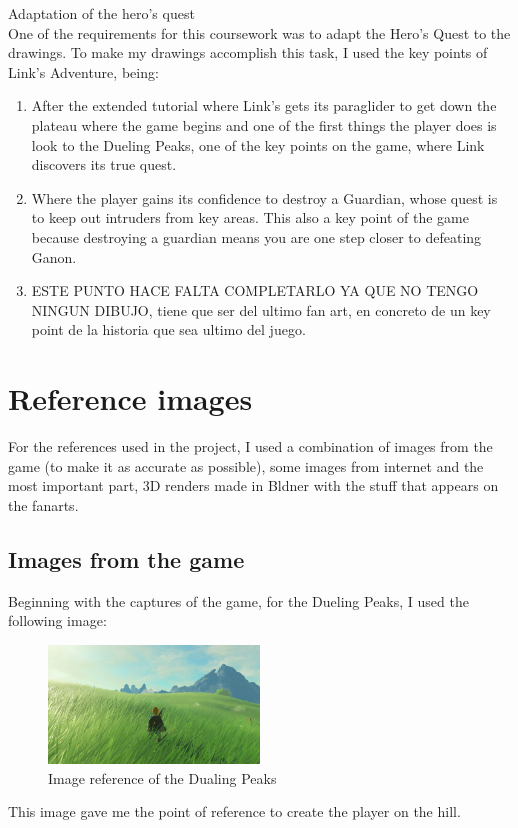 \documentclass{cup-pan}
\begin{document}
    \textcolor{PANDarkBlue}{\large Adaptation of the hero's quest}\\
    One of the requirements for this coursework was to adapt the Hero's Quest to the drawings.
    To make my drawings accomplish this task, I used the key points of Link's Adventure, being:\\
        \begin{enumerate}
            \item After the extended tutorial where Link's gets its paraglider to get down the plateau where the game begins and one of the first things the player does is look to the Dueling Peaks, one of the key points on the game, where Link discovers its true quest.\\
            \item Where the player gains its confidence to destroy a Guardian, whose quest is to keep out intruders from key areas. This also a key point of the game because destroying a guardian means you are one step closer to defeating Ganon. \\
            \item ESTE PUNTO HACE FALTA COMPLETARLO YA QUE NO TENGO NINGUN DIBUJO, tiene que ser del ultimo fan art, en concreto de un key point de la historia que sea ultimo del juego. \\
        \end{enumerate}


\section{Reference images}

    For the references used in the project, I used a combination of images from the game (to make it as accurate as possible), some images from internet and the most important part, 3D renders made in Bldner with the stuff that appears on the fanarts. 

    \subsection*{Images from the game}
    Beginning with the captures of the game, for the Dueling Peaks, I used the following image:\\
    \begin{figure}[H]
        \includegraphics[width=0.5\textwidth]{Imagenes/Referencias/article_img03_1.jpg}
        \caption{Image reference of the Dualing Peaks}
    \end{figure}
    This image gave me the point of reference to create the player on the hill. 
\end{document}
